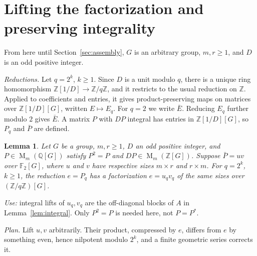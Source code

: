 \documentclass[11pt]{article}
\newtheorem{lemma}[theorem]{Lemma}
\theoremstyle{remark}
\numberwithin{equation}{section}
\newcommand{\F}{\mathbb F}
\newcommand{\Z}{\mathbb Z}
\newcommand{\Q}{\mathbb Q}
\newcommand{\Mat}{\operatorname{M}}
\begin{document}
\section{Lifting the factorization and preserving integrality}
\label{sec:lifting}

From here until Section~\ref{sec:assembly}, $G$ is an arbitrary group, $m,r\ge1$, and $D$ is an odd positive integer.

\emph{Reductions.} Let $q=2^k$, $k\ge1$. Since $D$ is a unit modulo $q$, there is a unique ring homomorphism $\Z[1/D]\to\Z/q\Z$, and it restricts to the usual reduction on $\Z$. Applied to coefficients and entries, it gives product-preserving maps on matrices over $\Z[1/D][G]$, written $E\mapsto E_q$. For $q=2$ we write $\bar E$. Reducing $E_q$ further modulo $2$ gives $\bar E$. A matrix $P$ with $DP$ integral has entries in $\Z[1/D][G]$, so $P_q$ and $\bar P$ are defined.

\begin{lemma}\label{lem:lift}
Let $G$ be a group, $m,r\ge1$, $D$ an odd positive integer, and
$P\in\Mat_m(\Q[G])$ satisfy $P^2=P$ and
$DP\in\Mat_m(\Z[G])$. Suppose $\bar P=uv$ over $\F_2[G]$, where $u$ and $v$
have respective sizes $m\times r$ and $r\times m$. For $q=2^k$,
$k\ge1$, the reduction $e=P_q$ has a factorization
$e=u_qv_q$ of the same sizes over $(\Z/q\Z)[G]$.
\end{lemma}

\emph{Use:} integral lifts of $u_q,v_q$ are the off-diagonal blocks of $A$ in Lemma~\ref{lem:integral}. Only $P^2=P$ is needed here, not $P=P^*$.

\emph{Plan.} Lift $u,v$ arbitrarily. Their product, compressed by $e$, differs from $e$ by something even, hence nilpotent modulo $2^k$, and a finite geometric series corrects it.
\end{document}
